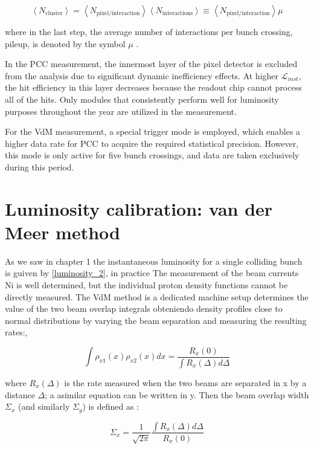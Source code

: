 \begin{equation}
\left < N_{\text{cluster}} \right > = \left < N_{\text{pixel}/\text{interaction}} \right >  \left < N_{\text{interactions}} \right > \equiv \left < N_{\text{pixel}/\text{interaction}} \right > \mu
\end{equation}

where in the last step, the average number of interactions per bunch crossing, pileup, is denoted by the symbol $\mu$ \cite{PCC_PAS_12_001}.

In the PCC measurement, the innermost layer of the pixel detector is excluded from the analysis due to significant dynamic inefficiency effects. At higher $\mathcal{L}_{inst}$, the hit efficiency in this layer decreases because the readout chip cannot process all of the hits. Only modules that consistently perform well for luminosity purposes throughout the year are utilized in the measurement.

For the VdM measurement, a special trigger mode is employed, which enables a higher data rate for PCC to acquire the required statistical precision. However, this mode is only active for five bunch crossings, and data are taken exclusively during this period.

\section{Luminosity calibration: van der Meer method}

As we saw  in chapter 1 the instantaneous luminosity for a single colliding bunch is guiven by \ref{luminosity_2}, in practice The measurement of the beam currents Ni is well determined, but the individual proton density functions cannot be directly measured. The VdM method is a dedicated machine setup determines the value of the two beam overlap integrals  obteniendo density profiles close to normal distributions by varying the beam separation and measuring the resulting rates:,

\begin{equation}
\int \rho_{x1}(x) \rho_{x2}(x) dx = \frac{R_{x}(0)}{\int R_{x}(\Delta) d\Delta}
\end{equation}

where $R_{x}(\Delta)$ is the rate measured when the two beams are separated in x by a distance $\Delta$; a asimilar equation can be written in y. Then the beam overlap width $\Sigma_{x}$ (and similarly $\Sigma_{y}$) is defined as \cite{pas_18}:

\begin{equation}
\Sigma_{x}= \frac{1}{\sqrt{2\pi}} \frac{\int R_{x}(\Delta)d\Delta}{R_{x}(0)}
\end{equation}


